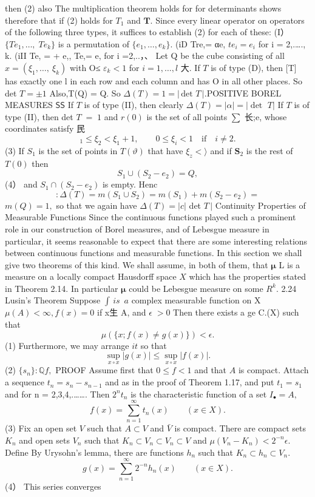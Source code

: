 then (2) also The multiplication theorem holds for for determinants shows therefore that if (2) holds for $T_{1}$ and ${\boldsymbol{T}}.$ Since every linear operator on operators of the following three types, it suffices to establish (2) for each of these: (I） $\{T e_{1},\ldots,\;T e_{k}\}$ is a permutation of $\{e_{1},\ldots,e_{k}\}.$ (iD Tre,= αe, $t e_{i}=e_{i}$ for i = 2,.…., k. (iII Te, = + e,, Te,= e, for i =2,..，、 Let Q be the cube consisting of all $x=(\xi_{1},\dots,\ \xi_{k})$ with O≤ $\scriptstyle{\varepsilon_{k}<1}$ for $i=1,\ldots,l$ 大. If ${\mathbf{}}T$ is of type (D), then [T] has exactly one l in each row and each column and has O in all other places. So det $T=\pm1$ Also,T(Q) = Q. So $\Delta(T)=1=\left|\,\mathrm{det}\,\,T\,\right|.$POSITIVE BOREL MEASURES ${\mathsf{S S}}$ If ${\mathbf{}}T$ is of type (II), then clearly $\Delta(T)=|\alpha|=|\operatorname*{det}\,\,T|$ If ${\mathbf{}}T$ is of type (II), then det $\scriptstyle T\;=\;1$ and $r(0)$ is the set of all points $\sum{}$ 长;e, whose coordinates satisfy 民 $$ {}_{1}\leq\xi_{2}<\xi_{1}+1,\qquad0\leq\xi_{i}<1\quad\mathrm{if}\quad i\neq2. $$ (3) If $S_{1}$ is the set of points in $\scriptstyle T(\vartheta)$ that have $\xi_{z}<\rangle$ and if ${\boldsymbol{S}}_{2}$ is the rest of $\scriptstyle T(0)$ then $$ S_{1}\cup(S_{2}-e_{2})=Q, $$ (4） and $S_{1}\cap(S_{2}-e_{2})$ is empty. Henc $$ :\Delta(T)=m(S_{1}\cup S_{2})=m(S_{1})+m(S_{2}-e_{2})= $$ $m(Q)=1,$ so that we again have $\Delta(T)=|c|$ det $T\,|$ Continuity Properties of Measurable Functions Since the continuous functions played such a prominent role in our construction of Borel measures, and of Lebesgue measure in particular, it seems reasonable to expect that there are some interesting relations between continuous functions and measurable functions. In this section we shall give two theorems of this kind. We shall assume, in both of them, that ${\boldsymbol{\mu}}$ L is a measure on a locally compact Hausdorff space $\textstyle X$ which has the properties stated in Theorem 2.14. In particular ${\boldsymbol{\mu}}$ could be Lebesgue measure on some $\textstyle R^{k}.$ 2.24 Lusin's Theorem Suppose $\int\,i s\,\,\,a$ complex measurable function on X $\mu(A)<\infty,f(x)=0$ if x生 A, and $\scriptstyle\epsilon\;>0$ Then there exists a ge C.(X) such that $$ \mu(\{x;f(x)\neq g(x)\})<\epsilon. $$ (1) Furthermore, we may arrange $i t$ so that $$ \operatorname*{sup}_{x\circ x}|g(x)|\leq\operatorname*{sup}_{x\circ x}|f(x)|. $$ (2) $\{s_{n}\}:\mathbb{Q}f,$ PROOF Assume first that $0\leq f<1$ and that $\scriptstyle A$ is compact. Attach a sequence $t_{n}=s_{n}-s_{n-1}$ and as in the proof of Theorem 1.17, and put $t_{1}=s_{1}$ and for n = 2,3,4,.……. Then $2^{n}t_{n}$ is the characteristic function of a set $\scriptstyle I_{\bullet}=A,$ $$ f(x)=\sum_{n=1}^{\infty}t_{n}(x)\qquad(x\in X). $$ (3) Fix an open set ${\mathbf{}}V$ such that $A\subset V$ and $\bar{V}$ is compact. There are compact sets $K_{n}$ and open sets ${\mathit{V}}_{n}$ such that $K_{n}\subset V_{n}\subset V_{n}\subset V$ and $\mu(V_{n}-K_{n})<2^{-n}\epsilon.$ Define By Urysohn's lemma, there are functions $h_{n}$ such that $K_{n}\subset h_{n}\subset V_{n}.$ $$ g(x)=\sum_{n=1}^{\infty}2^{-n}h_{n}(x)\qquad(x\in X). $$ (4） This series converges 